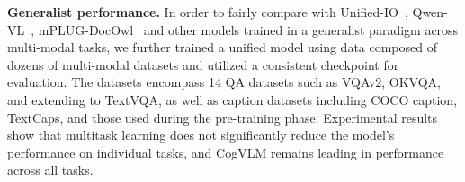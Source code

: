 \textbf{Generalist performance. }
In order to fairly compare with Unified-IO~\citep{lu2022unified}, Qwen-VL~\citep{bai2023qwen}, mPLUG-DocOwl~\citep{ye2023mplug} and other models trained in a generalist paradigm across multi-modal tasks, we further trained a unified model using data composed of dozens of multi-modal datasets and utilized a consistent checkpoint for evaluation. The datasets encompass 14 QA datasets such as VQAv2, OKVQA, and extending to TextVQA, as well as caption datasets including COCO caption, TextCaps, and those used during the pre-training phase. Experimental results show that multitask learning does not significantly reduce the model's performance on individual tasks, and CogVLM remains leading in performance across all tasks.
\begin{table*}[htbp]
\caption{Generalist performance on Image Captioning and VQA benchmarks.}
\end{table*} 
